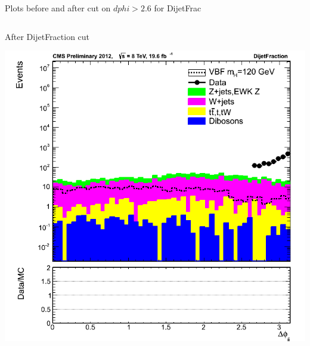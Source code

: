 \documentclass[8pt]{beamer}
\begin{document}
\begin{frame}{Plots before and after cut on $dphi>2.6$ for DijetFrac}
\begin{columns}
\begin{block}{After DijetFraction cut}
  \begin{center}
  \includegraphics[width=1.00\textwidth]{img/dphijj_2012_DijetFraction_log.png}
  \end{center}

\end{block}
  
\end{columns}
 
\end{frame}
\end{document}
